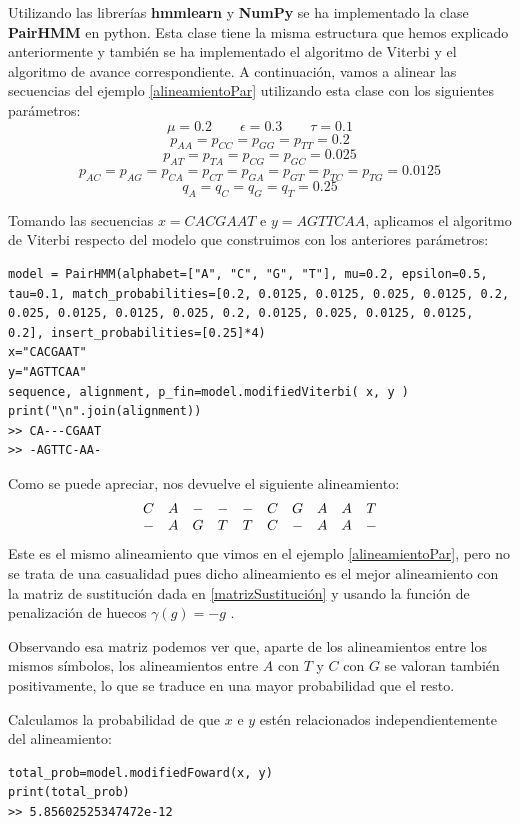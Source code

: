 \begin{exampleth}
Utilizando las librerías \textbf{hmmlearn} y \textbf{NumPy} se ha implementado la clase \textbf{PairHMM} en python. Esta clase tiene la misma estructura que hemos explicado anteriormente y también se ha implementado el algoritmo de Viterbi y el algoritmo de avance correspondiente. A continuación, vamos a alinear las secuencias del ejemplo \ref{alineamientoPar} utilizando esta clase con los siguientes parámetros:
\[\mu=0.2 \qquad \epsilon=0.3 \qquad \tau=0.1\]
\[p_{AA}=p_{CC}=p_{GG}=p_{TT}=0.2\]
\[p_{AT}=p_{TA}=p_{CG}=p_{GC}=0.025\]
\[p_{AC}=p_{AG}=p_{CA}=p_{CT}=p_{GA}=p_{GT}=p_{TC}=p_{TG}=0.0125\]
\[q_A=q_C=q_G=q_T=0.25\]

Tomando las secuencias $x=CACGAAT$ e $y=AGTTCAA$, aplicamos el algoritmo de Viterbi respecto del modelo que construimos con los anteriores parámetros:

\begin{verbatim}
model = PairHMM(alphabet=["A", "C", "G", "T"], mu=0.2, epsilon=0.5, tau=0.1, match_probabilities=[0.2, 0.0125, 0.0125, 0.025, 0.0125, 0.2, 0.025, 0.0125, 0.0125, 0.025, 0.2, 0.0125, 0.025, 0.0125, 0.0125, 0.2], insert_probabilities=[0.25]*4)
x="CACGAAT"
y="AGTTCAA"
sequence, alignment, p_fin=model.modifiedViterbi( x, y )
print("\n".join(alignment))
>> CA---CGAAT
>> -AGTTC-AA-
\end{verbatim}

Como se puede apreciar, nos devuelve el siguiente alineamiento:
    \[\begin{array}{c c c c c c c c c c}
        C & A & -& -& -& C& G& A& A& T \\
        -& A& G& T& T& C& -& A& A& -
    \end{array}\]
Este es el mismo alineamiento que vimos en el ejemplo \ref{alineamientoPar}, pero no se trata de una casualidad pues dicho alineamiento es el mejor alineamiento con la matriz de sustitución dada en \eqref{matrizSustitución} y usando la función de penalización de huecos $\gamma(g)=-g$ \cite{Vidyasagar}.

Observando esa matriz podemos ver que, aparte de los alineamientos entre los mismos símbolos, los alineamientos entre $A$ con $T$ y $C$ con $G$ se valoran también positivamente, lo que se traduce en una mayor probabilidad que el resto. 

Calculamos la probabilidad de que $x$ e $y$ estén relacionados independientemente del alineamiento:
\begin{verbatim}
total_prob=model.modifiedFoward(x, y)
print(total_prob)
>> 5.85602525347472e-12
\end{verbatim}


\end{exampleth}

